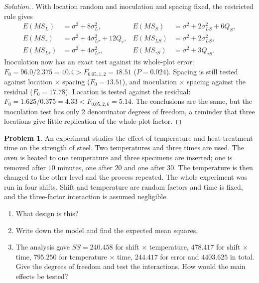 \documentclass[11pt,a4paper]{article}
\numberwithin{equation}{section}
\theoremstyle{definition}
\newtheorem{problemx}{Problem}[subsection]
\newenvironment{problem}{\begin{problemx}}{\end{problemx}}
\newenvironment{solution}
  {\renewcommand{\qedsymbol}{}\begin{proof}[\textit{Solution}.]}
  {\end{proof}}
\begin{document}
\begin{solution}
With location random and inoculation and spacing fixed, the restricted rule gives
\begin{align*}
E(MS_L) &= \sigma^2 + 8\sigma^2_L , & E(MS_S) &= \sigma^2 + 2\sigma^2_{LS} + 6Q_S , \\
E(MS_\tau) &= \sigma^2 + 4\sigma^2_{L\tau} + 12Q_\tau , & E(MS_{LS}) &= \sigma^2 + 2\sigma^2_{LS} , \\
E(MS_{L\tau}) &= \sigma^2 + 4\sigma^2_{L\tau} , & E(MS_{\tau S}) &= \sigma^2 + 3Q_{\tau S} .
\end{align*}
Inoculation now has an exact test against its whole-plot error: $F_0 = 96.0/2.375 = 40.4 > F_{0.05, 1, 2} = 18.51$ ($P = 0.024$). Spacing is still tested against location $\times$ spacing
($F_0 = 13.51$), and inoculation $\times$ spacing against the residual ($F_0 = 17.78$). Location is tested against the residual: $F_0 = 1.625/0.375 = 4.33 < F_{0.05, 2, 6} = 5.14$. The
conclusions are the same, but the inoculation test has only $2$ denominator degrees of freedom, a reminder that three locations give little
replication of the whole-plot factor.
\end{solution}

\begin{problem}
An experiment studies the effect of temperature and heat-treatment time on the strength of steel. Two temperatures and three times are used. The
oven is heated to one temperature and three specimens are inserted; one is removed after $10$ minutes, one after $20$ and one after $30$. The
temperature is then changed to the other level and the process repeated. The whole experiment was run in four shifts. Shift and temperature are
random factors and time is fixed, and the three-factor interaction is assumed negligible.
\begin{enumerate}[label=(\alph*)]
\item What design is this?
\item Write down the model and find the expected mean squares.
\item The analysis gave $SS = 240.458$ for shift $\times$ temperature, $478.417$ for shift $\times$ time, $795.250$ for temperature $\times$ time, $244.417$ for error and $4403.625$
in total. Give the degrees of freedom and test the interactions. How would the main effects be tested?
\end{enumerate}
\end{problem}
\end{document}
